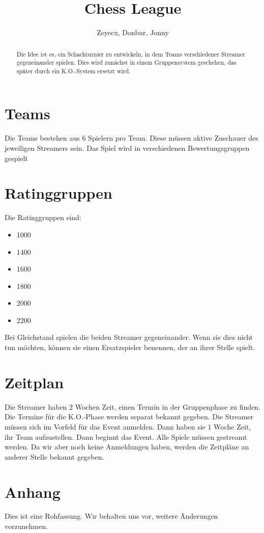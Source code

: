 \documentclass[preprint,12pt]{elsarticle}
\begin{document}
	
\begin{frontmatter}
		
		
\title{Chess League}
		
\author{Zeyecx, Donbur, Jonny}
		
\address{German Paper}
	 
\begin{abstract}
	Die Idee ist es, ein Schachturnier zu entwickeln, in dem Teams verschiedener Streamer gegeneinander spielen.
	Dies wird zunächst in einem Gruppensystem geschehen, das später durch ein K.O.-System ersetzt wird. 
\end{abstract}
\end{frontmatter}
\section{Teams}
Die Teams bestehen aus 6 Spielern pro Team. Diese müssen aktive Zuschauer des jeweiligen Streamers sein. 
Das Spiel wird in verschiedenen Bewertungsgruppen gespielt

\section{Ratinggruppen}

Die Ratinggruppen sind:
\begin{itemize}
	\item 1000
	\item 1400 
	\item 1600
	\item 1800
	\item 2000
	\item 2200
\end{itemize}
Bei Gleichstand spielen die beiden Streamer gegeneinander. Wenn sie dies nicht tun möchten, können sie einen Ersatzspieler benennen, der an ihrer Stelle spielt.

\section{Zeitplan}
Die Streamer haben 2 Wochen Zeit, einen Termin in der Gruppenphase zu finden. Die Termine für die K.O.-Phase werden separat bekannt gegeben.
Die Streamer müssen sich im Vorfeld für das Event anmelden. Dann haben sie 1 Woche Zeit, ihr Team aufzustellen.
Dann beginnt das Event.
Alle Spiele müssen gestreamt werden.
Da wir aber noch keine Anmeldungen haben, werden die Zeitpläne an anderer Stelle bekannt gegeben.

\section{Anhang}
Dies ist eine Rohfassung. Wir behalten uns vor, weitere Änderungen vorzunehmen.







	
\end{document}
